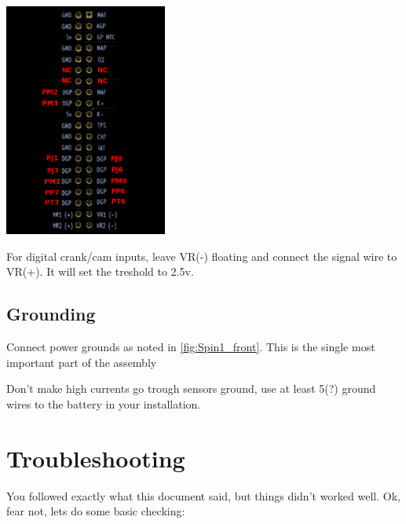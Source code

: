 \documentclass[12pt,a4paper,titlepage]{article}
\begin{document}
\begin{center}
\includegraphics[width=0.4\textwidth]{images/PumaSpin1HeaderPinOut.png}
\end{center}

For digital crank/cam inputs, leave VR(-) floating and connect the signal wire to VR(+). It will set the treshold to 2.5v.

\subsection{Grounding}

Connect power grounds as noted in \ref{fig:Spin1_front}. This is the single most important part of the assembly

Don't make high currents go trough sensors ground, use at least 5(?) ground wires to the battery in your installation.


\section{Troubleshooting}

You followed exactly what this document said, but things didn't worked well. Ok, fear not, lets do some basic checking:
\end{document}
